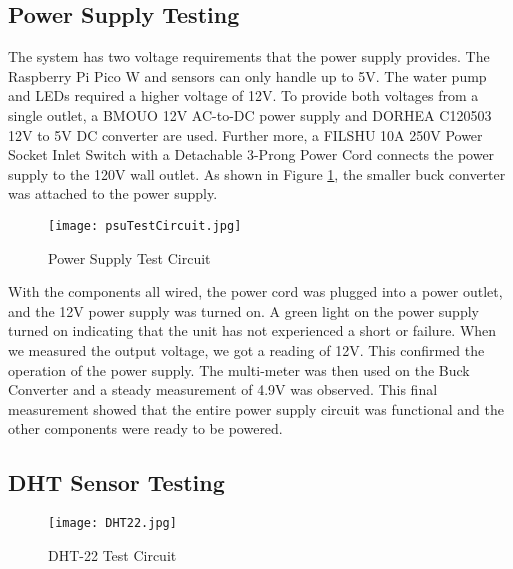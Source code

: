 \documentclass[12pt]{article} %
\begin{document}
\subsection{Power Supply Testing}

The system has two voltage requirements that the power supply provides. The Raspberry Pi Pico W and sensors can only handle up to 5V. The water pump and LEDs required a higher voltage of 12V. To provide both voltages from a single outlet, a BMOUO 12V AC-to-DC power supply and DORHEA C120503 12V to 5V DC converter are used. Further more, a FILSHU 10A 250V Power Socket Inlet Switch with a Detachable 3-Prong Power Cord connects the power supply to the 120V wall outlet. As shown in Figure \ref{fig:PSU test Circuit}, the smaller buck converter was attached to the power supply. 

\begin{figure}[H]
  \centering
  \texttt{[image: psuTestCircuit.jpg]}
  \caption{Power Supply Test Circuit}
  \label{fig:PSU test Circuit}
\end{figure}

With the components all wired, the power cord was plugged into a power outlet, and the 12V power supply was turned on. A green light on the power supply turned on indicating that the unit has not experienced a short or failure. When we measured the output voltage, we got a reading of 12V. This confirmed the operation of the power supply. The multi-meter was then used on the Buck Converter and a steady measurement of 4.9V was observed. This final measurement showed that the entire power supply circuit was functional and the other components were ready to be powered. 

\subsection{DHT Sensor Testing}

\begin{figure}[H]
  \centering
  \texttt{[image: DHT22.jpg]}
  \caption{DHT-22 Test Circuit}
  \label{fig:DHT-22 Test Circuit}
\end{figure}
\end{document}
